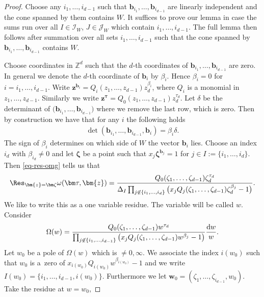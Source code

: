 \begin{proof}
Choose any $i_1,\dots,i_{d-1}$ such that $\bm{b}_{i_1},\dots,\bm{b}_{i_{d-1}}$ are linearly independent and the cone spanned by them contains $W$. It suffices to prove
our lemma in case the sums run over all $I\in\mathcal{I}_W$, $J\in\mathcal{J}_W$
which contain $i_1,\dots,i_{d-1}$. The full lemma then follows after summation over
all sets $i_1,\dots,i_{d-1}$ such that the cone spanned by $\bm{b}_{i_1},\dots,
\bm{b}_{i_{d-1}}$ contains $W$.

Choose coordinates in $\mathbb{Z}^d$ such that the $d$-th coordinates of
$\bm{b}_{i_1},\dots,\bm{b}_{i_{d-1}}$ are zero. In gene\-ral we denote the $d$-th
coordinate of $\bm{b}_i$ by $\beta_i$. Hence $\beta_i=0$ for $i=i_1,\dots,i_{d-1}$.
Write $\bm{z}^{\bm{b}_i} = Q_i(z_1,\dots,z_{d-1})z_d^{\beta_i}$, where $Q_i$ is a monomial in $z_1,\dots,z_{d-1}$. Similarly we write $\bm{z}^{\bm\tau}=Q_0(z_1,\dots,z_{d-1})
z_d^{\tau_d}$.
Let $\delta$ be the determinant of $\big(\bm{b}_{i_1},\dots,\bm{b}_{i_{d-1}}\big)$
where we remove the last row, which is zero.
Then by construction we have that for any $i$ the following holds
\begin{gather*}
\det\left(\bm{b}_{i_1},\dots,\bm{b}_{i_{d-1}},\bm{b}_i\right) = \beta_i \delta.
\end{gather*}
The sign of $\beta_i$ determines on which side of $W$ the vector $\bm{b}_i$ lies.
Choose an index $i_d$ with $\beta_{i_d}\ne0$ and let $\bm{\zeta}$ be a point such that
$x_j\bm{\zeta}^{\bm{b}_j} = 1$ for $j \in I:=\{i_1,\dots,i_d\}$. Then \eqref{eq-res-omg} tells us that
\begin{gather}\label{res-at-point}
\Res_{\bm{z}=\bm\zeta}\omega(\bm\tau,\bm{z})
=\frac{Q_0(\zeta_1,\dots,\zeta_{d-1})\zeta_d^{\tau_d}}
{\Delta_I\prod_{j \not \in \{i_1,\dots,i_d\}}
\big(x_jQ_j(\zeta_1,\dots,\zeta_{d-1})\zeta_d^{\beta_j} - 1\big)}.
\end{gather}
We like to write this as a one variable residue. The variable will be called $w$. Consider
\begin{gather*}
\Omega(w)=\frac{Q_0(\zeta_1,\dots,\zeta_{d-1})w^{\tau_d}}
{\prod_{j\not\in\{i_1,\dots,i_{d-1}\}}
\big(x_jQ_j(\zeta_1,\dots,\zeta_{d-1})w^{\beta_j}-1\big)}\frac{{\rm d}w}{w}.
\end{gather*}
Let $w_0$ be a pole of $\Omega(w)$ which is $\ne0,\infty$. We associate the index $i(w_0)$
such that $w_0$ is a~zero of $x_{i(w_0)}Q_{i(w_0)}w^{\beta_{i(w_0)}}-1$ and we write
$I(w_0)=\{i_1,\dots,i_{d-1},i(w_0)\}$. Furthermore we let $\bm{w}_0=
(\zeta_1,\dots,\zeta_{i_{d-1}},w_0)$. Take the residue at $w=w_0$,

\end{proof}
